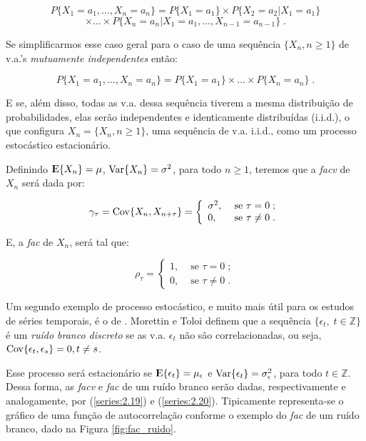 \[ P\{X_1 = a_1, \ldots, X_n = a_n\} = P\{X_1 = a_1\}\times P\{X_2 = a_2|X_1 = a_1\} \]
\[ \times\ldots\times P\{X_n = a_n|X_1 = a_1, \ldots, X_{n-1} = a_{n-1}\}\;. \]

Se simplificarmos esse caso geral para o caso de uma sequência $\{ X_n , n \geq 1 \}$ de v.a.'s \emph{mutuamente independentes} então:

\[ P\{X_1 = a_1, \ldots, X_n = a_n\} = P\{X_1 = a_1\}\times\ldots\times P\{X_n = a_n\}\;. \]

E se, além disso, todas as v.a. dessa sequência tiverem a mesma distribuição de probabilidades, elas serão independentes e identicamente distribuídas (i.i.d.), o que configura $X_n = \{ X_n , n \geq 1 \}$, uma sequência de v.a. i.i.d., como um processo estocástico estacionário.

Definindo ${\rm I\kern-.3em E}\{X_n\} = \mu$, $\mathrm{Var}\{X_n\} = \sigma^2$, para todo $n \geq 1$, teremos que a \emph{facv} de $X_n$ será dada por:

\begin{equation}\label{series:2.19}
\gamma_\tau = \mathrm{Cov}\{X_n, X_{n+\tau}\} = \left\{\begin{array}{lr} \sigma^2, & \text{ se } \tau = 0 \;; \\ 0, & \text{ se } \tau \neq 0\;. \end{array}\right.
\end{equation}

E, a \emph{fac} de $X_n$, será tal que:

\begin{equation}\label{series:2.20}
\rho_\tau = \left\{\begin{array}{lr} 1, & \text{ se } \tau = 0\;; \\ 0, & \text{ se } \tau \neq 0\;. \end{array}\right.
\end{equation}

Um segundo exemplo de processo estocástico, e muito mais útil para os estudos de séries temporais, é o de . Morettin e Toloi \citep{morettin} definem que a sequência $\{\epsilon_t,\; t \in \mathbb{Z}\}$ é um \emph{ruído branco discreto} se as v.a. $\epsilon_t$ não são correlacionadas, ou seja, $\mathrm{Cov}\{\epsilon_t, \epsilon_s\} = 0, t \neq s$.

Esse processo será estacionário se ${\rm I\kern-.3em E}\{\epsilon_t\} = \mu_\epsilon$ e $\mathrm{Var}\{\epsilon_t\} = \sigma_\epsilon^2$, para todo $t \in \mathbb{Z}$. Dessa forma, as \emph{facv} e \emph{fac} de um ruído branco serão dadas, respectivamente e analogamente, por (\ref{series:2.19}) e (\ref{series:2.20}). Tipicamente representa-se o gráfico de uma função de autocorrelação conforme o exemplo do \emph{fac} de um ruído branco, dado na Figura \ref{fig:fac_ruido}.

